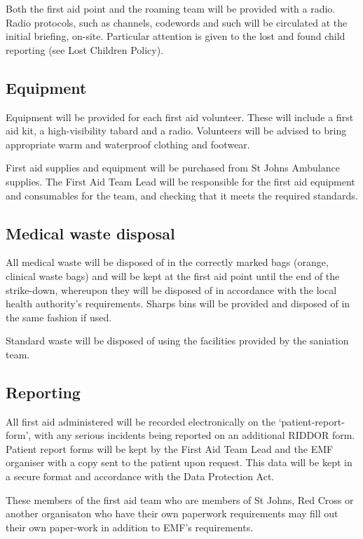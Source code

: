 Both the first aid point and the roaming team will be provided with a radio. Radio protocols, such as channels, codewords and such will be circulated at the initial briefing, on-site. Particular attention is given to the lost and found child reporting (see Lost Children Policy). 

\subsection{Equipment}
Equipment will be provided for each first aid volunteer. These will include a
first aid kit, a high-visibility tabard and a radio. Volunteers will be advised
to bring appropriate warm and waterproof clothing and footwear.

First aid supplies and equipment will be purchased from St Johns Ambulance
supplies. The First Aid Team Lead will be responsible for the first aid
equipment and consumables for the team, and checking that it meets the required
standards.

\subsection{Medical waste disposal}
All medical waste will be disposed of in the correctly marked bags (orange,
clinical waste bags) and will be kept at the first aid point until the end of
the strike-down, whereupon they will be disposed of in accordance with the
local health authority's requirements. Sharps bins will be provided and
disposed of in the same fashion if used.

Standard waste will be disposed of using the facilities provided by the saniation team.

\subsection{Reporting}
All first aid administered will be recorded electronically on the
‘patient-report-form', with any serious incidents being reported on an
additional RIDDOR form. Patient report forms will be kept by the First Aid Team
Lead and the EMF organiser with a copy sent to the patient upon request. This
data will be kept in a secure format and accordance with the Data Protection
Act.

These members of the first aid team who are members of St Johns, Red Cross or another organisaton who have their own paperwork requirements may fill out their own paper-work in addition to EMF's requirements.

